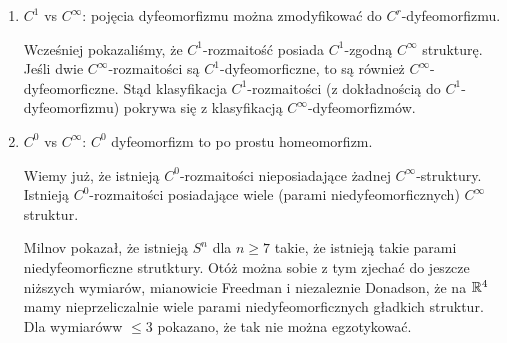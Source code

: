 \begin{remark}
$ $\newline
    \begin{enumerate}
        \item $C^1$ vs $C^\infty$: pojęcia dyfeomorfizmu można zmodyfikować do $C^r$-dyfeomorfizmu.
        
        Wcześniej pokazaliśmy, że $C^1$-rozmaitość posiada $C^1$-zgodną $C^\infty$ strukturę. Jeśli dwie $C^\infty$-rozmaitości są $C^1$-dyfeomorficzne, to są również $C^\infty$-dyfeomorficzne. Stąd klasyfikacja $C^1$-rozmaitości (z dokładnością do $C^1$-dyfeomorfizmu) pokrywa się z klasyfikacją $C^\infty$-dyfeomorfizmów.
        \item $C^0$ vs $C^\infty$: $C^0$ dyfeomorfizm to po prostu homeomorfizm. 
        
        Wiemy już, że istnieją $C^0$-rozmaitości nieposiadające żadnej $C^\infty$-struktury. Istnieją $C^0$-rozmaitości posiadające wiele (parami niedyfeomorficznych) $C^\infty$ struktur. 

        Milnov pokazał, że istnieją $S^n$ dla $n\geq7$ takie, że istnieją takie parami niedyfeomorficzne strutktury. Otóż można sobie z tym zjechać do jeszcze niższych wymiarów, mianowicie Freedman i niezaleznie Donadson, że na $\mathbb{R}^4$ mamy nieprzeliczalnie wiele parami niedyfeomorficznych gładkich struktur. Dla wymiaróww $\leq3$ pokazano, że tak nie można egzotykować. 
    \end{enumerate}
\end{remark}



















